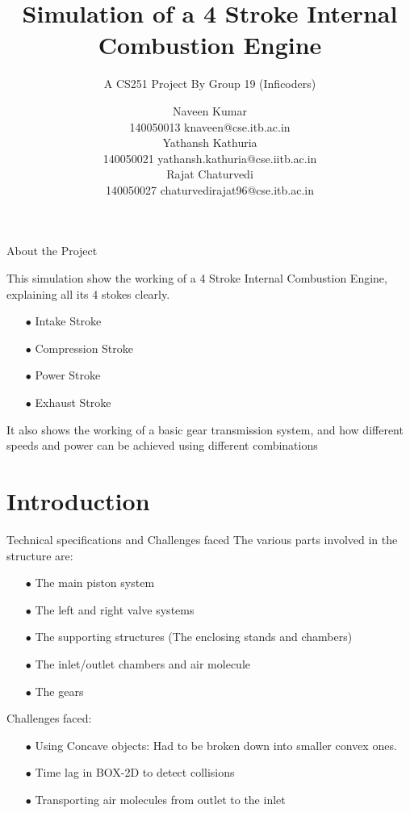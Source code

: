 \documentclass{beamer}
\title{Simulation of a 4 Stroke Internal Combustion Engine}
\subtitle{A CS251 Project By Group 19 (Inficoders)}
\author{Naveen Kumar \\ 140050013 knaveen@cse.itb.ac.in  \\ Yathansh Kathuria \\ 140050021 yathansh.kathuria@cse.iitb.ac.in \\ Rajat Chaturvedi \\ 140050027 chaturvedirajat96@cse.itb.ac.in}
\begin{document}
 
\frame{\titlepage}
 
\begin{frame}{About the Project}

 This simulation show the working of a 4 Stroke Internal Combustion Engine, 
 explaining all its 4 stokes clearly.\\
\begin{enumerate}
\item[$\bullet$]Intake Stroke\\
\item[$\bullet$]Compression Stroke\\
\item[$\bullet$]Power Stroke\\
\item[$\bullet$]Exhaust Stroke\\
\end{enumerate}
It also shows the working of a basic gear transmission system, and how different speeds and power can be achieved using different combinations


\end{frame}
\section{Introduction}
\begin{frame}{Technical specifications and Challenges faced}
The various parts involved in the structure are:\\
\begin{enumerate}
\item[$\bullet$]The main piston system\\
\item[$\bullet$]The left and right valve systems\\
\item[$\bullet$]The supporting structures (The enclosing stands and chambers)\\
\item[$\bullet$]The inlet/outlet chambers and air molecule\\
\item[$\bullet$]The gears\\
\end{enumerate}
Challenges faced:\\
\begin{enumerate}
\item[$\bullet$]Using Concave objects: Had to be broken down into smaller convex ones.
\item[$\bullet$]Time lag in BOX-2D to detect collisions
\item[$\bullet$]Transporting air molecules from outlet to the inlet
\end{enumerate}
\end{frame}
\end{document}
